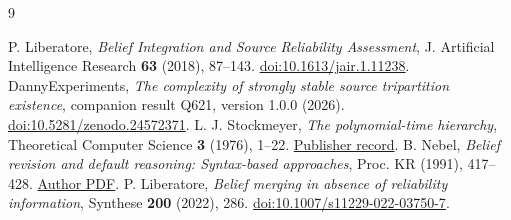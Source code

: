 \documentclass[11pt,a4paper]{amsart}
\begin{document}
\begin{thebibliography}{9}
\raggedright
{}
P. Liberatore, \emph{Belief Integration and Source Reliability
Assessment}, J. Artificial Intelligence Research \textbf{63}
(2018), 87--143. \href{https://doi.org/10.1613/jair.1.11238}{doi:10.1613/jair.1.11238}.
DannyExperiments, \emph{The complexity of strongly stable source
tripartition existence}, companion result Q621, version 1.0.0 (2026).
\href{https://doi.org/10.5281/zenodo.24572371}{doi:10.5281/zenodo.24572371}.
L. J. Stockmeyer, \emph{The polynomial-time hierarchy},
Theoretical Computer Science \textbf{3} (1976), 1--22.
\href{https://doi.org/10.1016/0304-3975(76)90061-X}{Publisher record}.
B. Nebel, \emph{Belief revision and default reasoning:
Syntax-based approaches}, Proc. KR (1991), 417--428.
\href{https://gki.informatik.uni-freiburg.de/papers/nebel-kr91.pdf}{Author PDF}.
P. Liberatore, \emph{Belief merging in absence of reliability
information}, Synthese \textbf{200} (2022), 286.
\href{https://doi.org/10.1007/s11229-022-03750-7}{doi:10.1007/s11229-022-03750-7}.
\end{thebibliography}
\end{document}
